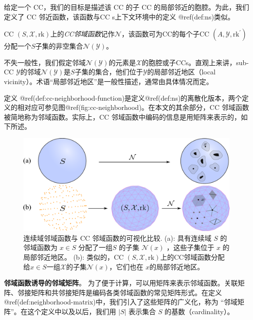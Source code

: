 \documentclass[
  12pt,
]{krantz}
\begin{document}
给定一个 CC，我们的目标是描述该 CC 的子 CC
的局部邻近的胞腔。为此，我们定义了 CC 邻近函数，该函数与CC
s上下文环境中的定义 @ref(def:ns)类似。

\label{cc-neighborhood-function}
CC
\((S,\mathcal{X}, \mbox{rk})\)上的\emph{CC邻域函数}记作\(\mathcal{N}\)，该函数可为CC的每个子CC
\((A,\mathcal{Y},\mbox{rk}^{\prime})\)
分配一个\(S\)子集的非空集合\(\mathcal{N}(\mathcal{Y})\)。

不失一般性，我们假定邻域\(\mathcal{N}(\mathcal{Y})\)的元素是\(\mathcal{X}\)的胞腔或子CCs。直观上来讲，sub-CC
\(\mathcal{Y}\)的邻域\(\mathcal{N}(\mathcal{Y})\)是\(S\)子集的集合，他们位于\(\mathcal{Y}\)的局部邻近地区（local
vicinity）。术语``局部邻近地区''是一般性描述，通常由具体情况而定。

定义
@ref(def:cc-neighborhood-function)是定义@ref(def:ns)的离散化版本，两个定义的相对应可参见图@ref(fig:cc-neighborhood)。在本文的其余部分，CC
邻域函数被简地称为邻域函数。实际上，CC
邻域函数中编码的信息是用矩阵来表示的，如下所述。

\begin{figure}

{\centering \includegraphics{figures/cts_discrete_nbhd} 

}

\caption{连续域邻域函数与 CC 邻域函数的可视化比较. (a): 具有连续域 $S$ 的邻域函数为 $x\in S$ 分配了一组$S$ 的子集 $\mathcal{N}(x)$ ，这些子集位于 $x$ 的局部邻近地区。 (b): 类似的，CC $(S,\mathcal{X}, \mbox{rk})$上的CC邻域函数分配给$x\in S$一组$\mathcal{X}$的子集$\mathcal{N}(x)$，它们也在 $x$的局部邻近地区。}\label{fig:cc-neighborhood}
\end{figure}

\textbf{邻域函数诱导的邻域矩阵}。
为了便于计算，可以用矩阵来表示邻域函数。关联矩阵、邻接矩阵和共邻接矩阵是编码各类邻域函数的常见矩阵形式。在定义
@ref(def:neighborhood-matrix)中，我们引入了这些矩阵的广义化，称为
``邻域矩阵''。在这个定义中以及以后，我们用 \(|S|\) 表示集合 \(S\)
的基数（cardinality）。
\end{document}
